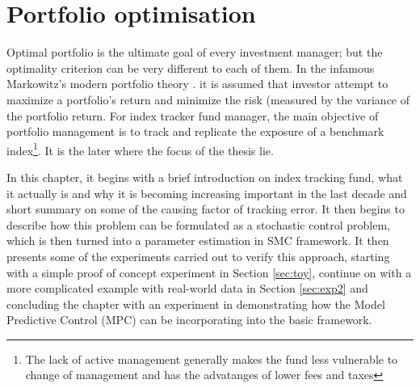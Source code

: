 \chapter{Portfolio optimisation}
\graphicspath{{Chapter4/figures/}}
\label{lab:PO}
Optimal portfolio is the ultimate goal of every investment manager; but the optimality criterion can be very different to each of them. In the infamous Markowitz's modern portfolio theory \cite{HM52}. it is assumed that investor attempt to maximize a portfolio's return and minimize the risk (measured by the variance of the portfolio return. For index tracker fund manager, the main objective of portfolio management is to track and replicate the exposure of a benchmark index\footnote{The lack of active management generally makes the fund less vulnerable to change of management and has the advatanges of lower fees and taxes}. It is the later where the focus of the thesis lie.

In this chapter, it begins with a brief introduction on index tracking fund, what it actually is and why it is becoming increasing important in the last decade and short summary on some of the causing factor of tracking error. It then begins to describe how this problem can be formulated as a stochastic control problem, which is then turned into a parameter estimation in SMC framework. It then presents some of the experiments carried out to verify this approach, starting with a simple proof of concept experiment in Section \ref{sec:toy}, continue on with a more complicated example with real-world data in Section \ref{sec:exp2} and concluding the chapter with an experiment in demonstrating how the Model Predictive Control (MPC) can be incorporating into the basic framework.



